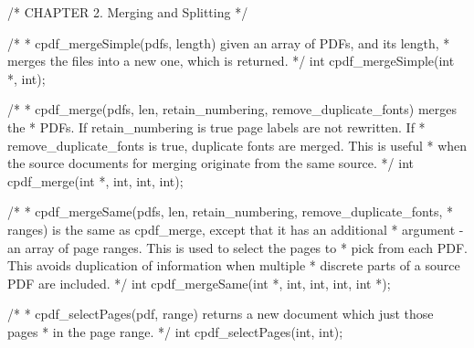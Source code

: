 /* CHAPTER 2. Merging and Splitting */

/*
 * cpdf_mergeSimple(pdfs, length) given an array of PDFs, and its length,
 * merges the files into a new one, which is returned.
 */
int cpdf_mergeSimple(int *, int);

/*
 * cpdf_merge(pdfs, len, retain_numbering, remove_duplicate_fonts) merges the
 * PDFs. If retain_numbering is true page labels are not rewritten. If
 * remove_duplicate_fonts is true, duplicate fonts are merged. This is useful
 * when the source documents for merging originate from the same source.
 */
int cpdf_merge(int *, int, int, int);

/*
 * cpdf_mergeSame(pdfs, len, retain_numbering, remove_duplicate_fonts,
 * ranges) is the same as cpdf_merge, except that it has an additional
 * argument - an array of page ranges. This is used to select the pages to
 * pick from each PDF. This avoids duplication of information when multiple
 * discrete parts of a source PDF are included.
 */
int cpdf_mergeSame(int *, int, int, int, int *);

/*
 * cpdf_selectPages(pdf, range) returns a new document which just those pages
 * in the page range.
 */
int cpdf_selectPages(int, int);

